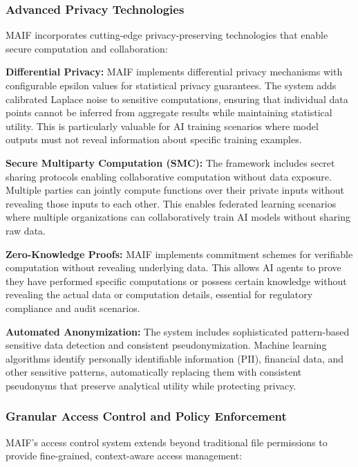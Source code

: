 \documentclass[conference]{IEEEtran}
\begin{document}
\subsubsection{Advanced Privacy Technologies}

MAIF incorporates cutting-edge privacy-preserving technologies that enable secure computation and collaboration:

\textbf{Differential Privacy:} MAIF implements differential privacy mechanisms with configurable epsilon values for statistical privacy guarantees. The system adds calibrated Laplace noise to sensitive computations, ensuring that individual data points cannot be inferred from aggregate results while maintaining statistical utility. This is particularly valuable for AI training scenarios where model outputs must not reveal information about specific training examples.

\textbf{Secure Multiparty Computation (SMC):} The framework includes secret sharing protocols enabling collaborative computation without data exposure. Multiple parties can jointly compute functions over their private inputs without revealing those inputs to each other. This enables federated learning scenarios where multiple organizations can collaboratively train AI models without sharing raw data.

\textbf{Zero-Knowledge Proofs:} MAIF implements commitment schemes for verifiable computation without revealing underlying data. This allows AI agents to prove they have performed specific computations or possess certain knowledge without revealing the actual data or computation details, essential for regulatory compliance and audit scenarios.

\textbf{Automated Anonymization:} The system includes sophisticated pattern-based sensitive data detection and consistent pseudonymization. Machine learning algorithms identify personally identifiable information (PII), financial data, and other sensitive patterns, automatically replacing them with consistent pseudonyms that preserve analytical utility while protecting privacy.

\subsubsection{Granular Access Control and Policy Enforcement}

MAIF's access control system extends beyond traditional file permissions to provide fine-grained, context-aware access management:
\end{document}
